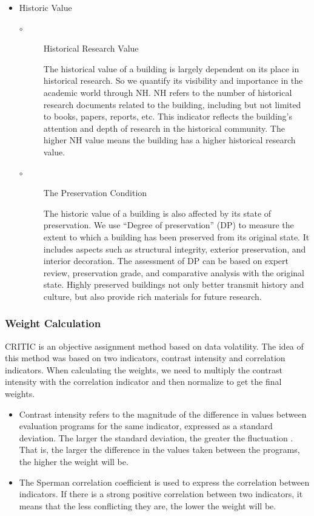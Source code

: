 \documentclass{mcmthesis}
\begin{document}
\begin{itemize}
\item Historic Value

\begin{description}
\item [$\circ$] Historical Research Value

The historical value of a building is largely dependent on its place in historical research.
So we quantify its visibility and importance in the academic world through NH. NH
refers to the number of historical research documents related to the building, including
but not limited to books, papers, reports, etc. This indicator reflects the building's attention
and depth of research in the historical community. The higher NH value means
the building has a higher historical research value.

\item [$\circ$] The Preservation Condition

The historic value of a building is also affected by its state of preservation. We use
``Degree of preservation'' (DP) to measure the extent to which a building has been preserved
from its original state. It includes aspects such as structural integrity, exterior
preservation, and interior decoration. The assessment of DP can be based on expert
review, preservation grade, and comparative analysis with the original state. Highly
preserved buildings not only better transmit history and culture, but also provide rich
materials for future research.
\end{description}
\end{itemize}

\subsubsection{Weight Calculation}

CRITIC is an objective assignment method based on data volatility. The idea of this
method was based on two indicators, contrast intensity and correlation indicators. When calculating
the weights, we need to multiply the contrast intensity with the correlation indicator
and then normalize to get the final weights.

\begin{itemize}
\item Contrast intensity refers to the magnitude of the difference in values between evaluation
programs for the same indicator, expressed as a standard deviation. The larger the standard
deviation, the greater the fluctuation . That is, the larger the difference in the values taken between
the programs, the higher the weight will be.
\item The Sperman correlation coefficient is used to express the correlation between indicators.
If there is a strong positive correlation between two indicators, it means that the less conflicting
they are, the lower the weight will be.
\end{itemize}
\end{document}
